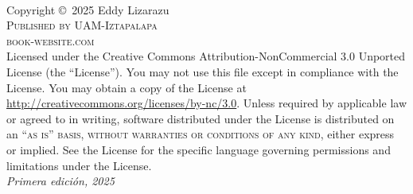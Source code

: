 \documentclass[12pt,fleqn]{book} %
\begin{document}

\newpage
~\vfill
\thispagestyle{empty}

\noindent Copyright \copyright\ 2025 Eddy Lizarazu\\ %

\noindent \textsc{Published by UAM-Iztapalapa}\\ %

\noindent \textsc{book-website.com}\\ %

\noindent Licensed under the Creative Commons Attribution-NonCommercial 3.0 Unported License (the ``License''). You may not use this file except in compliance with the License. You may obtain a copy of the License at \url{http://creativecommons.org/licenses/by-nc/3.0}. Unless required by applicable law or agreed to in writing, software distributed under the License is distributed on an \textsc{``as is'' basis, without warranties or conditions of any kind}, either express or implied. See the License for the specific language governing permissions and limitations under the License.\\ %

\noindent \textit{Primera edición, 2025} %




\pagestyle{empty} %

\tableofcontents %

\cleardoublepage %

\pagestyle{fancy} %


\end{document}
